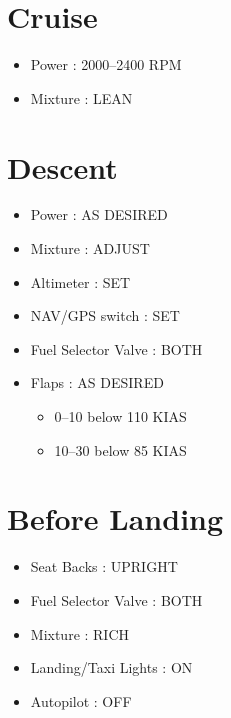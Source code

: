 \chapter{Cruise}
\label{cruise}

\begin{itemize}
\item{} Power : 2000--2400 RPM

\item{} Mixture : LEAN
\newpage

\end{itemize}

\chapter{Descent}
\label{descent}

\begin{itemize}
\item{} Power : AS DESIRED

\item{} Mixture : ADJUST

\item{} Altimeter : SET

\item{} NAV\slash GPS switch : SET

\item{} Fuel Selector Valve : BOTH

\item{} Flaps : AS DESIRED

\begin{itemize}
\item{} 0--10 below 110 KIAS

\item{} 10--30 below 85 KIAS

\end{itemize}

\end{itemize}

\chapter{Before Landing}
\label{beforelanding}

\begin{itemize}
\item{} Seat Backs : UPRIGHT

\item{} Fuel Selector Valve : BOTH

\item{} Mixture : RICH

\item{} Landing\slash Taxi Lights : ON

\item{} Autopilot : OFF

\end{itemize}

